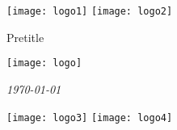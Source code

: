 \begin{titlepage}
	\texttt{[image: logo1]}
	\hspace{\fill}
	\texttt{[image: logo2]}
	\vspace{1.5cm}
	\begin{center}
		
		\LARGE{Pretitle}
		
		\vskip1.5cm
		
		\Huge{\textbf{\thetitle}}
		
		\vskip1.5cm
		
		\texttt{[image: logo]}
		
		\vskip1.5cm
		
		\Large{\theauthor}
	
		\vskip 1cm
		
		\textit{\today}
	\end{center}
	\vspace{2cm}
	\hspace{\fill}
	\texttt{[image: logo3]}
	\hspace{1cm}
	\texttt{[image: logo4]}
	\hspace{\fill}
\end{titlepage}
